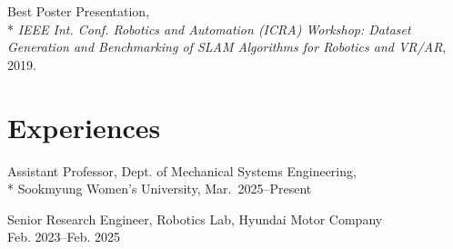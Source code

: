 \documentclass[margin]{res}
\begin{document}
\begin{resume}
		\par Best Poster Presentation,\\*
		\textit{IEEE Int. Conf. Robotics and Automation (ICRA) Workshop: Dataset Generation and Benchmarking of SLAM Algorithms for Robotics and VR/AR}, 2019.

		\section{Experiences}
		\par Assistant Professor, Dept. of Mechanical Systems Engineering,\\*
		Sookmyung Women's University, Mar.~2025--Present

		\par Senior Research Engineer, Robotics Lab, Hyundai Motor Company\\
		Feb. 2023--Feb. 2025
		

\end{resume}
\end{document}
